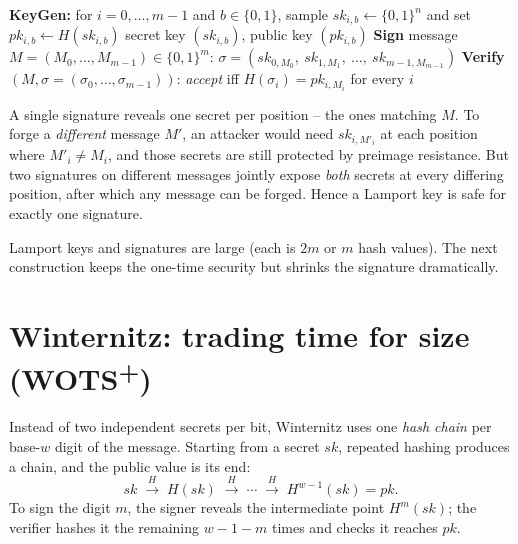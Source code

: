 \begin{algorithm}[H]
\caption{Lamport one-time signature}
\label{alg:lamport}
\begin{algorithmic}[1]
\Statex \textbf{KeyGen:}
\State for $i=0,\dots,m-1$ and $b\in\{0,1\}$, sample $sk_{i,b}\gets\{0,1\}^n$ and set $pk_{i,b}\gets H(sk_{i,b})$
\State \Return secret key $(sk_{i,b})$, public key $(pk_{i,b})$
\Statex \textbf{Sign} message $M=(M_0,\dots,M_{m-1})\in\{0,1\}^m$:
\State \Return $\sigma=(sk_{0,M_0},\ sk_{1,M_1},\ \dots,\ sk_{m-1,M_{m-1}})$
\Statex \textbf{Verify} $(M,\sigma=(\sigma_0,\dots,\sigma_{m-1}))$:
\State \Return \emph{accept} iff $H(\sigma_i)=pk_{i,M_i}$ for every $i$
\end{algorithmic}
\end{algorithm}

\begin{remark}
A single signature reveals one secret per position -- the ones matching $M$. To forge a \emph{different} message $M'$, an attacker would need $sk_{i,M'_i}$ at each position where $M'_i\neq M_i$, and those secrets are still protected by preimage resistance. But two signatures on different messages jointly expose \emph{both} secrets at every differing position, after which any message can be forged. Hence a Lamport key is safe for exactly one signature.
\end{remark}

Lamport keys and signatures are large (each is $2m$ or $m$ hash values). The next construction keeps the one-time security but shrinks the signature dramatically.

\section{Winternitz: trading time for size (WOTS\textsuperscript{+})}
Instead of two independent secrets per bit, Winternitz uses one \emph{hash chain} per base-$w$ digit of the message. Starting from a secret $sk$, repeated hashing produces a chain, and the public value is its end:
\[
sk \;\xrightarrow{H}\; H(sk) \;\xrightarrow{H}\; \cdots \;\xrightarrow{H}\; H^{w-1}(sk)=pk.
\]
To sign the digit $m$, the signer reveals the intermediate point $H^{m}(sk)$; the verifier hashes it the remaining $w-1-m$ times and checks it reaches $pk$.

